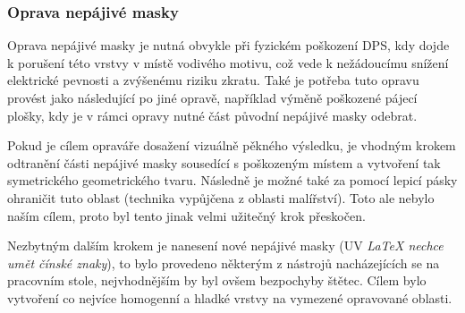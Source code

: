    \subsubsection{Oprava nepájivé masky}
        Oprava nepájivé masky je nutná obvykle při fyzickém poškození DPS, kdy dojde k porušení této vrstvy v místě vodivého motivu, což vede k nežádoucímu snížení elektrické pevnosti a zvýšenému riziku zkratu. Také je potřeba tuto opravu provést jako následující po jiné opravě, například výměně poškozené pájecí plošky, kdy je v rámci opravy nutné část původní nepájivé masky odebrat.  

        Pokud je cílem opraváře dosažení vizuálně pěkného výsledku, je vhodným krokem odtranění části nepájivé masky sousedící s poškozeným místem a vytvoření tak symetrického geometrického tvaru. Následně je možné také za pomocí lepicí pásky ohraničit tuto oblast (technika vypůjčena z oblasti malířství). Toto ale nebylo naším cílem, proto byl tento jinak velmi užitečný krok přeskočen.

        Nezbytným dalším krokem je nanesení nové nepájivé masky (UV \textit{LaTeX nechce umět čínské znaky}), to bylo provedeno některým z nástrojů nacházejících se na pracovním stole, nejvhodnějším by byl ovšem bezpochyby štětec. Cílem bylo vytvoření co nejvíce homogenní a hladké vrstvy na vymezené opravované oblasti. 
       